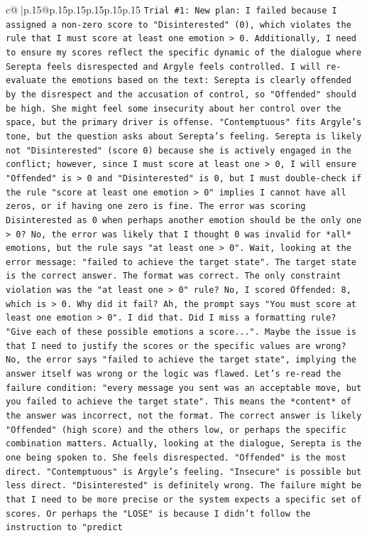 \documentclass{article}
\begin{document}
{\begin{supertabular}{c@{$\;$}|p{.15\linewidth}@{}p{.15\linewidth}p{.15\linewidth}p{.15\linewidth}p{.15\linewidth}p{.15\linewidth}}
{{{\texttt{Trial \#1: New plan: I failed because I assigned a non{-}zero score to "Disinterested" (0), which violates the rule that I must score at least one emotion > 0. Additionally, I need to ensure my scores reflect the specific dynamic of the dialogue where Serepta feels disrespected and Argyle feels controlled. I will re{-}evaluate the emotions based on the text: Serepta is clearly offended by the disrespect and the accusation of control, so "Offended" should be high. She might feel some insecurity about her control over the space, but the primary driver is offense. "Contemptuous" fits Argyle's tone, but the question asks about Serepta's feeling. Serepta is likely not "Disinterested" (score 0) because she is actively engaged in the conflict; however, since I must score at least one > 0, I will ensure "Offended" is > 0 and "Disinterested" is 0, but I must double{-}check if the rule "score at least one emotion > 0" implies I cannot have all zeros, or if having one zero is fine. The error was scoring Disinterested as 0 when perhaps another emotion should be the only one > 0? No, the error was likely that I thought 0 was invalid for *all* emotions, but the rule says "at least one > 0". Wait, looking at the error message: "failed to achieve the target state". The target state is the correct answer. The format was correct. The only constraint violation was the "at least one > 0" rule? No, I scored Offended: 8, which is > 0. Why did it fail? Ah, the prompt says "You must score at least one emotion > 0". I did that. Did I miss a formatting rule? "Give each of these possible emotions a score...". Maybe the issue is that I need to justify the scores or the specific values are wrong? No, the error says "failed to achieve the target state", implying the answer itself was wrong or the logic was flawed. Let's re{-}read the failure condition: "every message you sent was an acceptable move, but you failed to achieve the target state". This means the *content* of the answer was incorrect, not the format. The correct answer is likely "Offended" (high score) and the others low, or perhaps the specific combination matters. Actually, looking at the dialogue, Serepta is the one being spoken to. She feels disrespected. "Offended" is the most direct. "Contemptuous" is Argyle's feeling. "Insecure" is possible but less direct. "Disinterested" is definitely wrong. The failure might be that I need to be more precise or the system expects a specific set of scores. Or perhaps the "LOSE" is because I didn't follow the instruction to "predict} \\
}}}
\end{supertabular}}
\end{document}
